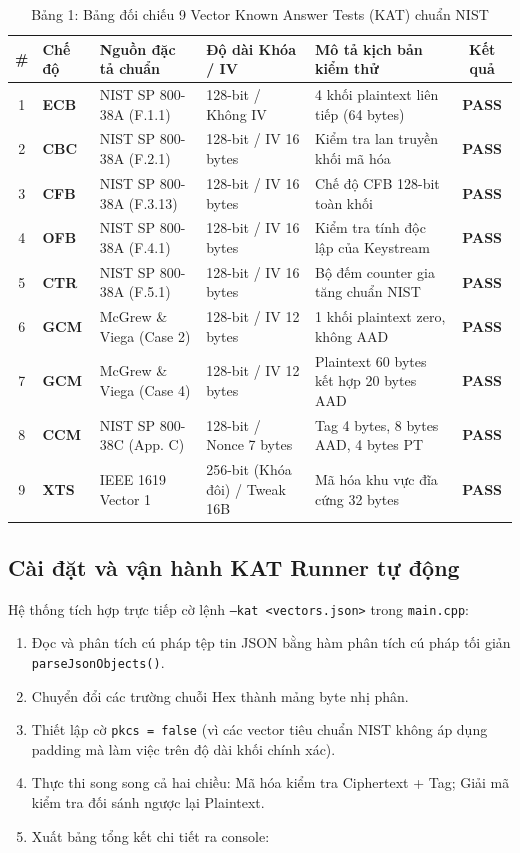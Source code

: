 \documentclass[12pt, a4paper]{report}
\begin{document}
\begin{table}[H]
\centering
\small
\caption{Bảng 1: Bảng đối chiếu 9 Vector Known Answer Tests (KAT) chuẩn NIST}
\label{tab:kat}
\begin{tabular}{cllllc}
\toprule
\textbf{\#} & \textbf{Chế độ} & \textbf{Nguồn đặc tả chuẩn} & \textbf{Độ dài Khóa / IV} & \textbf{Mô tả kịch bản kiểm thử} & \textbf{Kết quả} \\
\midrule
1 & \textbf{ECB} & NIST SP 800-38A (F.1.1) & 128-bit / Không IV & 4 khối plaintext liên tiếp (64 bytes) & \textbf{PASS} \\
2 & \textbf{CBC} & NIST SP 800-38A (F.2.1) & 128-bit / IV 16 bytes & Kiểm tra lan truyền khối mã hóa & \textbf{PASS} \\
3 & \textbf{CFB} & NIST SP 800-38A (F.3.13) & 128-bit / IV 16 bytes & Chế độ CFB 128-bit toàn khối & \textbf{PASS} \\
4 & \textbf{OFB} & NIST SP 800-38A (F.4.1) & 128-bit / IV 16 bytes & Kiểm tra tính độc lập của Keystream & \textbf{PASS} \\
5 & \textbf{CTR} & NIST SP 800-38A (F.5.1) & 128-bit / IV 16 bytes & Bộ đếm counter gia tăng chuẩn NIST & \textbf{PASS} \\
6 & \textbf{GCM} & McGrew \& Viega (Case 2) & 128-bit / IV 12 bytes & 1 khối plaintext zero, không AAD & \textbf{PASS} \\
7 & \textbf{GCM} & McGrew \& Viega (Case 4) & 128-bit / IV 12 bytes & Plaintext 60 bytes kết hợp 20 bytes AAD & \textbf{PASS} \\
8 & \textbf{CCM} & NIST SP 800-38C (App. C) & 128-bit / Nonce 7 bytes & Tag 4 bytes, 8 bytes AAD, 4 bytes PT & \textbf{PASS} \\
9 & \textbf{XTS} & IEEE 1619 Vector 1 & 256-bit (Khóa đôi) / Tweak 16B & Mã hóa khu vực đĩa cứng 32 bytes & \textbf{PASS} \\
\bottomrule
\end{tabular}
\end{table}

\subsection{Cài đặt và vận hành KAT Runner tự động}
Hệ thống tích hợp trực tiếp cờ lệnh \texttt{--kat <vectors.json>} trong \texttt{main.cpp}:
\begin{enumerate}
    \item Đọc và phân tích cú pháp tệp tin JSON bằng hàm phân tích cú pháp tối giản \texttt{parseJsonObjects()}.
    \item Chuyển đổi các trường chuỗi Hex thành mảng byte nhị phân.
    \item Thiết lập cờ \texttt{pkcs = false} (vì các vector tiêu chuẩn NIST không áp dụng padding mà làm việc trên độ dài khối chính xác).
    \item Thực thi song song cả hai chiều: Mã hóa kiểm tra Ciphertext + Tag; Giải mã kiểm tra đối sánh ngược lại Plaintext.
    \item Xuất bảng tổng kết chi tiết ra console:
\end{enumerate}
\end{document}
